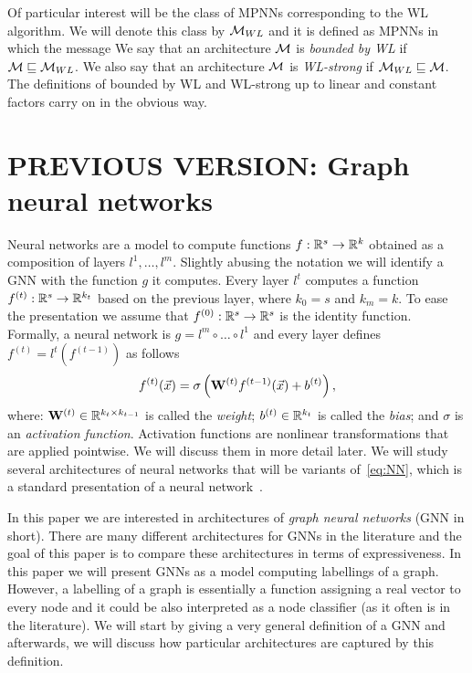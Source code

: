 Of particular interest will be the class of MPNNs corresponding to the WL algorithm. 
We will denote this class by $\mathcal{M}_{WL}$ and it is defined as MPNNs in which the message 
We say that an architecture $\mathcal{M}$ is \emph{bounded by WL} if $\mathcal{M}\sqsubseteq \mathcal{M}_{WL}$. We also say that an architecture $\mathcal{M}$ is \emph{WL-strong} if $\mathcal{M}_{WL} \sqsubseteq \mathcal{M}$. The definitions of bounded by WL and WL-strong up to linear and constant factors carry on in the obvious way.


\section{PREVIOUS VERSION: Graph neural networks}
Neural networks are a model to compute functions $f : \mathbb{R}^s \to \mathbb{R}^k$ obtained as a composition of layers $l^1,\ldots, l^m$.  Slightly abusing the notation we will identify a GNN with the function $g$ it computes. Every layer $l^t$ computes a function $f^{(t)} : \mathbb{R}^{s} \to \mathbb{R}^{k_t}$ based on the previous layer, where $k_0 = s$ and $k_m =k$. To ease the presentation we assume that $f^{(0)} : \mathbb{R}^s \to \mathbb{R}^s$ is the identity function. Formally, a neural network is $g = l^m \circ \ldots \circ l^1 $ and every layer defines $f^{(t)} = l^t(f^{(t-1)})$ as follows
\begin{equation}\label{eq:NN}
 f^{(t)} (\vec{x}) = \sigma \left(\mathbf{W}^{(t)} f^{(t-1)}(\vec{x}) + b^{(t)}  \right),
\end{equation}
where: $\mathbf{W}^{(t)} \in \mathbb{R}^{k_{t} \times k_{t-1}}$ is called the \emph{weight}; $b^{(t)} \in \mathbb{R}^{k_t}$ is called the \emph{bias}; and $\sigma$ is an \emph{activation function}. Activation functions are nonlinear transformations that are applied pointwise. We will discuss them in more detail later. We will study several architectures of neural networks that will be variants of~\eqref{eq:NN}, which is a standard presentation of a neural network~\cite{?}.

In this paper we are interested in architectures of \emph{graph neural networks} (GNN in short). 
There are many different architectures for GNNs in the literature and the goal of this paper is to compare these architectures in terms of expressiveness. In this paper we will present GNNs as a model computing labellings of a graph. However, a labelling of a graph is essentially a function assigning a real vector to every node and it could be also interpreted as a node classifier (as it often is in the literature). We will start by giving a very general definition of a GNN and afterwards, we will discuss how particular architectures are captured by this definition.

